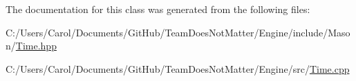 The documentation for this class was generated from the following files\+:\begin{DoxyCompactItemize}
\item 
C\+:/\+Users/\+Carol/\+Documents/\+Git\+Hub/\+Team\+Does\+Not\+Matter/\+Engine/include/\+Mason/\hyperlink{_time_8hpp}{Time.\+hpp}\item 
C\+:/\+Users/\+Carol/\+Documents/\+Git\+Hub/\+Team\+Does\+Not\+Matter/\+Engine/src/\hyperlink{_time_8cpp}{Time.\+cpp}\end{DoxyCompactItemize}

